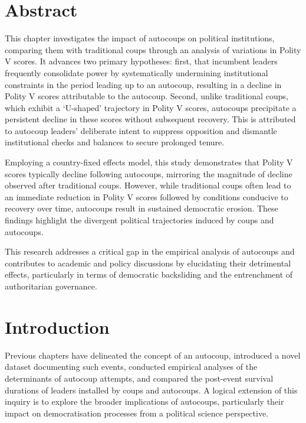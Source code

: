 \documentclass[
  12pt,
]{report}
\begin{document}
\section*{Abstract}\label{abstract-4}

This chapter investigates the impact of autocoups on political
institutions, comparing them with traditional coups through an analysis
of variations in Polity V scores. It advances two primary hypotheses:
first, that incumbent leaders frequently consolidate power by
systematically undermining institutional constraints in the period
leading up to an autocoup, resulting in a decline in Polity V scores
attributable to the autocoup. Second, unlike traditional coups, which
exhibit a `U-shaped' trajectory in Polity V scores, autocoups
precipitate a persistent decline in these scores without subsequent
recovery. This is attributed to autocoup leaders' deliberate intent to
suppress opposition and dismantle institutional checks and balances to
secure prolonged tenure.

Employing a country-fixed effects model, this study demonstrates that
Polity V scores typically decline following autocoups, mirroring the
magnitude of decline observed after traditional coups. However, while
traditional coups often lead to an immediate reduction in Polity V
scores followed by conditions conducive to recovery over time, autocoups
result in sustained democratic erosion. These findings highlight the
divergent political trajectories induced by coups and autocoups.

This research addresses a critical gap in the empirical analysis of
autocoups and contributes to academic and policy discussions by
elucidating their detrimental effects, particularly in terms of
democratic backsliding and the entrenchment of authoritarian governance.

\newpage

\section{Introduction}\label{introduction-4}

Previous chapters have delineated the concept of an autocoup, introduced
a novel dataset documenting such events, conducted empirical analyses of
the determinants of autocoup attempts, and compared the post-event
survival durations of leaders installed by coups and autocoups. A
logical extension of this inquiry is to explore the broader implications
of autocoups, particularly their impact on democratisation processes
from a political science perspective.
\end{document}
